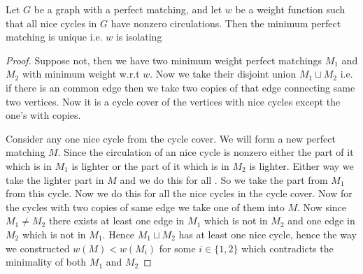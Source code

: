 \begin{lemma}\label{all-nice-cycles-nonzero-circulation-unique-perfect-matching}
	Let $G$ be a graph with a perfect matching, and let $w$ be a weight function such that all nice cycles in $G$ have nonzero circulations. Then the minimum perfect matching is unique i.e. $w$ is isolating
\end{lemma}
\begin{proof}
	Suppose  not, then we have two minimum weight perfect matchings $M_1$ and $M_2$ with minimum weight w.r.t $w$. Now we take their disjoint union $M_1\sqcup M_2$ i.e. if there is an common edge then we take two copies of that edge connecting same two vertices. Now it is a cycle cover of the vertices with nice cycles except the one's with copies. 
	
	Consider any one nice cycle from the cycle cover. We will form a new perfect matching $M$. Since the circulation of an nice cycle is nonzero either the part of it which is in
	$M_1$ is lighter or the part of it which is in $M_2$ is lighter. Either way we take the lighter part in $M$ and we do this for all . So we take the part from $M_1$ from this cycle. Now we do this for all the nice cycles in the cycle cover. Now for the cycles with two copies of same edge we take one of them into $M$. Now since $M_1\neq M_2$ there exists at least one edge in $M_1$ which is not in $M_2$ and one edge in $M_2$ which is not in $M_1$. Hence $M_1\sqcup M_2$ has at least one nice cycle, hence the way we constructed $w(M)<w(M_i)$ for some $i\in \{1,2\}$ which contradicts the minimality of both $M_1$ and $M_2$
\end{proof}